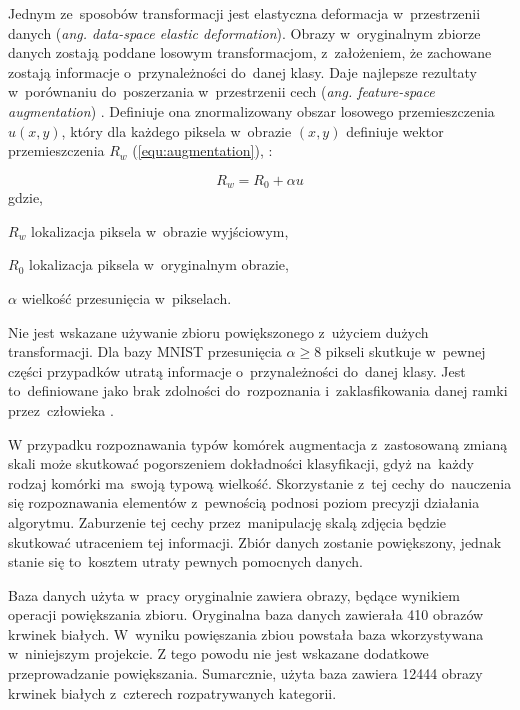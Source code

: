 {\parindent0pt %
Jednym ze~sposobów transformacji jest elastyczna deformacja w~przestrzenii danych (\textit{ang. data-space elastic deformation}). Obrazy w~oryginalnym zbiorze danych zostają poddane losowym transformacjom, z~założeniem, że zachowane zostają informacje o~przynależności do~danej klasy. Daje najlepsze rezultaty w~porównaniu do~poszerzania w~przestrzenii cech (\textit{ang. feature-space augmentation}) \cite{Wong2016UnderstandingDA}. Definiuje ona znormalizowany obszar losowego przemieszczenia \(u(x,y)\), który dla każdego piksela w~obrazie \((x,y)\) definiuje wektor przemieszczenia \(R_w\) (\ref{equ:augmentation}), \cite{Wong2016UnderstandingDA}:

\begin{equation}
R_w = R_0 + \alpha u
\label{equ:augmentation}
\end{equation}
gdzie,
\begin{eqwhere}[2cm]
	\item[$R_w$] lokalizacja piksela w~obrazie wyjściowym,
	\item[$R_0$] lokalizacja piksela w~oryginalnym obrazie,
	\item[$\alpha$] wielkość przesunięcia w~pikselach.
\end{eqwhere}

Nie jest wskazane używanie zbioru powiększonego z~użyciem dużych transformacji. Dla bazy MNIST przesunięcia \( \alpha \geq 8 \)  pikseli skutkuje w~pewnej części przypadków utratą informacje o~przynależności do~danej klasy. Jest to~definiowane jako brak zdolności do~rozpoznania i~zaklasfikowania danej ramki przez~człowieka \cite{Wong2016UnderstandingDA}.

W przypadku rozpoznawania typów komórek augmentacja z~zastosowaną zmianą skali może skutkować pogorszeniem dokładności klasyfikacji, gdyż na~każdy rodzaj komórki ma~swoją typową wielkość. Skorzystanie z~tej cechy do~nauczenia się rozpoznawania elementów z~pewnością podnosi poziom precyzji działania algorytmu. Zaburzenie tej cechy przez~manipulację skalą zdjęcia będzie skutkować utraceniem tej informacji. Zbiór danych zostanie powiększony, jednak stanie się to~kosztem utraty pewnych pomocnych danych.

Baza danych użyta w~pracy oryginalnie zawiera obrazy, będące wynikiem operacji powiększania zbioru. Oryginalna baza danych zawierała 410 obrazów krwinek białych. W~wyniku powięszania zbiou powstała baza wkorzystywana w~niniejszym projekcie. Z tego powodu nie jest wskazane dodatkowe przeprowadzanie powiększania. Sumarcznie, użyta baza zawiera 12444 obrazy krwinek białych z~czterech rozpatrywanych kategorii.
}


